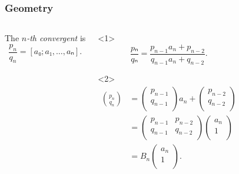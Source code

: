 \documentclass[aspectratio=169]{beamer}
\begin{document}
\begin{frame}
  \frametitle{Geometry}
  \small

  \begin{columns}[T]
    The \emph{$n$-th convergent} is \[\frac{p_n}{q_n} = [a₀; a₁, …, aₙ].\]
    \begin{lemma}
      \begin{onlyenv}<1>
        \[
          \frac{pₙ}{qₙ} = \frac{p_{n-1} a_n + p_{n-2}}{q_{n-1} a_n + q_{n-2}}.
        \]
        \vspace{8em}
      \end{onlyenv}
      \begin{onlyenv}<2>
        \begin{align*}
          \binom{p_n}{q_n}
          & = \begin{pmatrix}
            p_{n-1} \\ q_{n-1} \\
          \end{pmatrix} a_n + \begin{pmatrix}
            p_{n-2} \\ q_{n-2} \\
          \end{pmatrix} \\
          & = \begin{pmatrix}
            p_{n-1} & p_{n-2} \\
            q_{n-1} & q_{n-2} \\
          \end{pmatrix}
          \begin{pmatrix}
            a_n \\
            1 \\
          \end{pmatrix} \\
          & =
          B_n
          \begin{pmatrix}
            a_n \\
            1 \\
          \end{pmatrix}.
        \end{align*}
      \end{onlyenv}
    \end{lemma}


\end{columns}
\end{frame}
\end{document}
